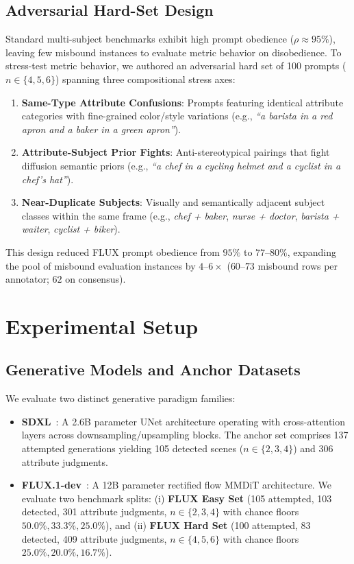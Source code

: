 \subsection{Adversarial Hard-Set Design}
\label{sec:method_hard_set}
Standard multi-subject benchmarks exhibit high prompt obedience ($\rho \approx 95\%$), leaving few misbound instances to evaluate metric behavior on disobedience. To stress-test metric behavior, we authored an adversarial hard set of 100 prompts ($n \in \{4, 5, 6\}$) spanning three compositional stress axes:
\begin{enumerate}[leftmargin=*,itemsep=1pt,topsep=1pt]
    \item \textbf{Same-Type Attribute Confusions}: Prompts featuring identical attribute categories with fine-grained color/style variations (e.g., \emph{``a barista in a red apron and a baker in a green apron''}).
    \item \textbf{Attribute-Subject Prior Fights}: Anti-stereotypical pairings that fight diffusion semantic priors (e.g., \emph{``a chef in a cycling helmet and a cyclist in a chef's hat''}).
    \item \textbf{Near-Duplicate Subjects}: Visually and semantically adjacent subject classes within the same frame (e.g., \emph{chef + baker}, \emph{nurse + doctor}, \emph{barista + waiter}, \emph{cyclist + biker}).
\end{enumerate}
This design reduced FLUX prompt obedience from $95\%$ to $77$--$80\%$, expanding the pool of misbound evaluation instances by $4$--$6\times$ ($60$--$73$ misbound rows per annotator; $62$ on consensus).

\section{Experimental Setup}
\label{sec:setup}

\subsection{Generative Models and Anchor Datasets}
\label{sec:setup_models}
We evaluate two distinct generative paradigm families:
\begin{itemize}[leftmargin=*,itemsep=1pt,topsep=2pt]
    \item \textbf{SDXL}~\citep{podell2023sdxl}: A 2.6B parameter UNet architecture operating with cross-attention layers across downsampling/upsampling blocks. The anchor set comprises 137 attempted generations yielding 105 detected scenes ($n \in \{2, 3, 4\}$) and 306 attribute judgments.
    \item \textbf{FLUX.1-dev}~\citep{flux2024}: A 12B parameter rectified flow MMDiT architecture. We evaluate two benchmark splits: (i) \textbf{FLUX Easy Set} (105 attempted, 103 detected, 301 attribute judgments, $n \in \{2, 3, 4\}$ with chance floors $50.0\%, 33.3\%, 25.0\%$), and (ii) \textbf{FLUX Hard Set} (100 attempted, 83 detected, 409 attribute judgments, $n \in \{4, 5, 6\}$ with chance floors $25.0\%, 20.0\%, 16.7\%$).
\end{itemize}

